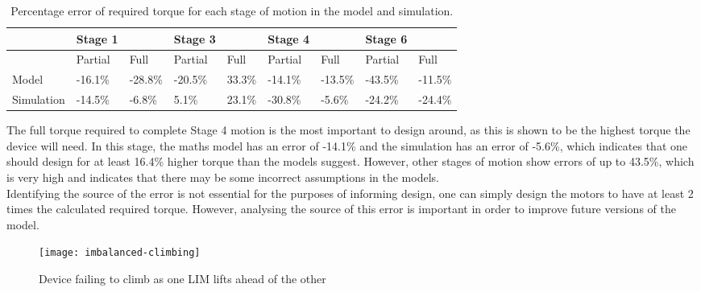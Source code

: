 \begin{table}[!ht]
	\centering
	\caption{Percentage error of required torque for each stage of motion in the model and simulation.}
	\label{tab:error}
	\begin{tabular}{|l|l|l|l|l|l|l|l|l|}
		\hline
		~ & Stage 1 & ~ & Stage 3 & ~ & Stage 4 & ~ & Stage 6 & ~ \\ \hline
		~ & Partial & Full & Partial & Full & Partial & Full & Partial & Full \\ \hline
		Model & -16.1\% & -28.8\% & -20.5\% & 33.3\% & -14.1\% & -13.5\% & -43.5\% & -11.5\% \\ \hline
		Simulation & -14.5\% & -6.8\% & 5.1\% & 23.1\% & -30.8\% & -5.6\% & -24.2\% & -24.4\% \\ \hline
	\end{tabular}
\end{table}

The full torque required to complete Stage 4 motion is the most important to design around, as this is shown to be the highest torque the device will need. In this stage, the maths model has an error of -14.1\% and the simulation has an error of -5.6\%, which indicates that one should design for at least 16.4\% higher torque than the models suggest. However, other stages of motion show errors of up to 43.5\%, which is very high and indicates that there may be some incorrect assumptions in the models.\\

Identifying the source of the error is not essential for the purposes of informing design, one can simply design the motors to have at least 2 times the calculated required torque. However, analysing the source of this error is important in order to improve future versions of the model.\\

\begin{wrapfigure}{r}{0.35\textwidth}
	\centering
	\texttt{[image: imbalanced-climbing]}
	\caption{Device failing to climb as one LIM lifts ahead of the other}
	\label{fig:imbalanced-climbing}
\end{wrapfigure}

